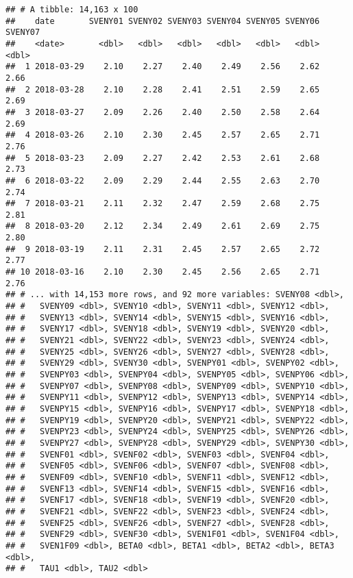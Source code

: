 \documentclass[]{book}
\begin{document}
\begin{verbatim}
## # A tibble: 14,163 x 100
##    date       SVENY01 SVENY02 SVENY03 SVENY04 SVENY05 SVENY06 SVENY07
##    <date>       <dbl>   <dbl>   <dbl>   <dbl>   <dbl>   <dbl>   <dbl>
##  1 2018-03-29    2.10    2.27    2.40    2.49    2.56    2.62    2.66
##  2 2018-03-28    2.10    2.28    2.41    2.51    2.59    2.65    2.69
##  3 2018-03-27    2.09    2.26    2.40    2.50    2.58    2.64    2.69
##  4 2018-03-26    2.10    2.30    2.45    2.57    2.65    2.71    2.76
##  5 2018-03-23    2.09    2.27    2.42    2.53    2.61    2.68    2.73
##  6 2018-03-22    2.09    2.29    2.44    2.55    2.63    2.70    2.74
##  7 2018-03-21    2.11    2.32    2.47    2.59    2.68    2.75    2.81
##  8 2018-03-20    2.12    2.34    2.49    2.61    2.69    2.75    2.80
##  9 2018-03-19    2.11    2.31    2.45    2.57    2.65    2.72    2.77
## 10 2018-03-16    2.10    2.30    2.45    2.56    2.65    2.71    2.76
## # ... with 14,153 more rows, and 92 more variables: SVENY08 <dbl>,
## #   SVENY09 <dbl>, SVENY10 <dbl>, SVENY11 <dbl>, SVENY12 <dbl>,
## #   SVENY13 <dbl>, SVENY14 <dbl>, SVENY15 <dbl>, SVENY16 <dbl>,
## #   SVENY17 <dbl>, SVENY18 <dbl>, SVENY19 <dbl>, SVENY20 <dbl>,
## #   SVENY21 <dbl>, SVENY22 <dbl>, SVENY23 <dbl>, SVENY24 <dbl>,
## #   SVENY25 <dbl>, SVENY26 <dbl>, SVENY27 <dbl>, SVENY28 <dbl>,
## #   SVENY29 <dbl>, SVENY30 <dbl>, SVENPY01 <dbl>, SVENPY02 <dbl>,
## #   SVENPY03 <dbl>, SVENPY04 <dbl>, SVENPY05 <dbl>, SVENPY06 <dbl>,
## #   SVENPY07 <dbl>, SVENPY08 <dbl>, SVENPY09 <dbl>, SVENPY10 <dbl>,
## #   SVENPY11 <dbl>, SVENPY12 <dbl>, SVENPY13 <dbl>, SVENPY14 <dbl>,
## #   SVENPY15 <dbl>, SVENPY16 <dbl>, SVENPY17 <dbl>, SVENPY18 <dbl>,
## #   SVENPY19 <dbl>, SVENPY20 <dbl>, SVENPY21 <dbl>, SVENPY22 <dbl>,
## #   SVENPY23 <dbl>, SVENPY24 <dbl>, SVENPY25 <dbl>, SVENPY26 <dbl>,
## #   SVENPY27 <dbl>, SVENPY28 <dbl>, SVENPY29 <dbl>, SVENPY30 <dbl>,
## #   SVENF01 <dbl>, SVENF02 <dbl>, SVENF03 <dbl>, SVENF04 <dbl>,
## #   SVENF05 <dbl>, SVENF06 <dbl>, SVENF07 <dbl>, SVENF08 <dbl>,
## #   SVENF09 <dbl>, SVENF10 <dbl>, SVENF11 <dbl>, SVENF12 <dbl>,
## #   SVENF13 <dbl>, SVENF14 <dbl>, SVENF15 <dbl>, SVENF16 <dbl>,
## #   SVENF17 <dbl>, SVENF18 <dbl>, SVENF19 <dbl>, SVENF20 <dbl>,
## #   SVENF21 <dbl>, SVENF22 <dbl>, SVENF23 <dbl>, SVENF24 <dbl>,
## #   SVENF25 <dbl>, SVENF26 <dbl>, SVENF27 <dbl>, SVENF28 <dbl>,
## #   SVENF29 <dbl>, SVENF30 <dbl>, SVEN1F01 <dbl>, SVEN1F04 <dbl>,
## #   SVEN1F09 <dbl>, BETA0 <dbl>, BETA1 <dbl>, BETA2 <dbl>, BETA3 <dbl>,
## #   TAU1 <dbl>, TAU2 <dbl>
\end{verbatim}
\end{document}
